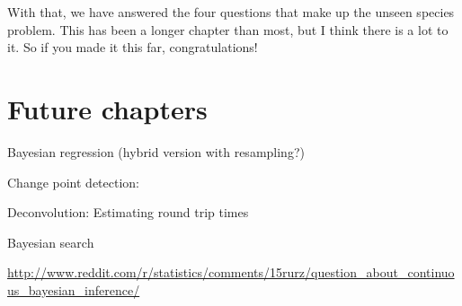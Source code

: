 \documentclass[12pt]{book}
\begin{document}
With that, we have answered the four questions that
make up the unseen species problem.  This has been a longer
chapter than most, but I think there is a lot to it.  So if
you made it this far, congratulations!



\chapter{Future chapters}

Bayesian regression (hybrid version with resampling?)

Change point detection: 

Deconvolution: Estimating round trip times

Bayesian search

\url{http://www.reddit.com/r/statistics/comments/15rurz/question_about_continuous_bayesian_inference/}
\end{document}

